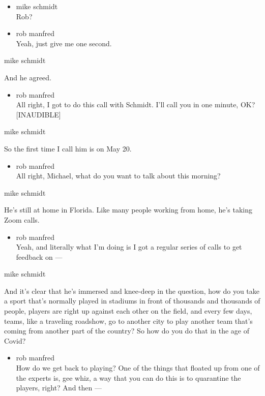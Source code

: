 \begin{itemize}
\item
  mike schmidt\\
  Rob?
\item
  rob manfred\\
  Yeah, just give me one second.
\end{itemize}

mike schmidt

And he agreed.

\begin{itemize}
\tightlist
\item
  rob manfred\\
  All right, I got to do this call with Schmidt. I'll call you in one
  minute, OK? {[}INAUDIBLE{]}
\end{itemize}

mike schmidt

So the first time I call him is on May 20.

\begin{itemize}
\tightlist
\item
  rob manfred\\
  All right, Michael, what do you want to talk about this morning?
\end{itemize}

mike schmidt

He's still at home in Florida. Like many people working from home, he's
taking Zoom calls.

\begin{itemize}
\tightlist
\item
  rob manfred\\
  Yeah, and literally what I'm doing is I got a regular series of calls
  to get feedback on ---
\end{itemize}

mike schmidt

And it's clear that he's immersed and knee-deep in the question, how do
you take a sport that's normally played in stadiums in front of
thousands and thousands of people, players are right up against each
other on the field, and every few days, teams, like a traveling
roadshow, go to another city to play another team that's coming from
another part of the country? So how do you do that in the age of Covid?

\begin{itemize}
\tightlist
\item
  rob manfred\\
  How do we get back to playing? One of the things that floated up from
  one of the experts is, gee whiz, a way that you can do this is to
  quarantine the players, right? And then ---
\end{itemize}

